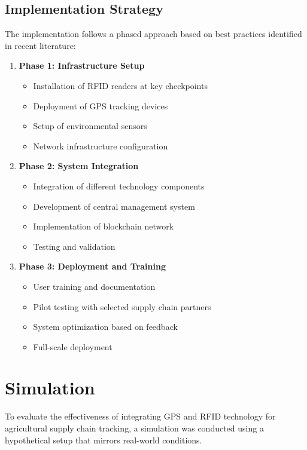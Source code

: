 \documentclass[conference]{IEEEtran}
\begin{document}
\subsection{Implementation Strategy}
The implementation follows a phased approach based on best practices identified in recent literature:

\begin{enumerate}
    \item \textbf{Phase 1: Infrastructure Setup} \cite{visconti2020development}
    \begin{itemize}
        \item Installation of RFID readers at key checkpoints
        \item Deployment of GPS tracking devices
        \item Setup of environmental sensors
        \item Network infrastructure configuration
    \end{itemize}

    \item \textbf{Phase 2: System Integration}
    \begin{itemize}
        \item Integration of different technology components
        \item Development of central management system
        \item Implementation of blockchain network
        \item Testing and validation
    \end{itemize}

    \item \textbf{Phase 3: Deployment and Training}
    \begin{itemize}
        \item User training and documentation
        \item Pilot testing with selected supply chain partners
        \item System optimization based on feedback
        \item Full-scale deployment
    \end{itemize}
\end{enumerate}

\section{Simulation}

To evaluate the effectiveness of integrating GPS and RFID technology for agricultural supply chain tracking, a simulation was conducted using a hypothetical setup that mirrors real-world conditions.
\end{document}
